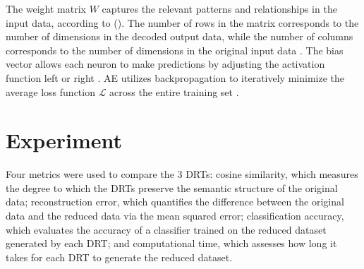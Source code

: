 \documentclass[12pt]{article}
\begin{document}
The weight matrix $W$ captures the relevant patterns and relationships in the input data, according to \citeauthor{hastie_friedman_tisbshirani_2017_nn} (\citeyear{hastie_friedman_tisbshirani_2017_nn}). The number of rows in the matrix corresponds to the number of dimensions in the decoded output data, while the number of columns corresponds to the number of dimensions in the original input data \parencite{hastie_friedman_tisbshirani_2017_nn}. The bias vector allows each neuron to make predictions by adjusting the activation function left or right \parencite{hastie_friedman_tisbshirani_2017_nn}. AE utilizes backpropagation to iteratively minimize the average loss function $\mathcal{L}$ across the entire training set \parencite{hastie_friedman_tisbshirani_2017_nn}.
\section{Experiment}
\hspace{\parindent} Four metrics were used to compare the 3 DRTs: cosine similarity, which measures the degree to which the DRTs preserve the semantic structure of the original data; reconstruction error, which quantifies the difference between the original data and the reduced data via the mean squared error; classification accuracy, which evaluates the accuracy of a classifier trained on the reduced dataset generated by each DRT; and computational time, which assesses how long it takes for each DRT to generate the reduced dataset.
\end{document}
